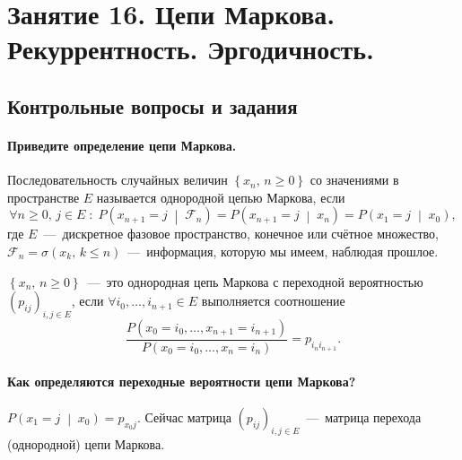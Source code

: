 \chapter*{Занятие 16. Цепи Маркова. Рекуррентность. Эргодичность.}

\section*{Контрольные вопросы и задания}

\subsubsection*{Приведите определение цепи Маркова.}

Последовательность случайных величин $ \left\{ x_n, \, n \geq 0 \right\} $
со значениями в пространстве $E$ называется однородной цепью Маркова, если
\begin{equation*}
  \forall n \geq 0, \,
  j \in E \; : \;
  P \left( x_{n + 1} = j \; \middle| \; \mathcal{F}_n \right) =
  P \left( x_{n + 1} = j \; \middle| \; x_n \right) =
  P \left( x_1 = j \; \middle| \; x_0 \right),
\end{equation*}
где $E$~---~дискретное фазовое пространство, конечное или счётное множество,
$ \mathcal{F}_n = \sigma \left( x_k, \, k \leq n \right) $~---~информация,
которую мы имеем, наблюдая прошлое.

$ \left\{ x_n, \, n \geq 0 \right\} $~---~это однородная цепь Маркова с
переходной вероятностью $ \left( p_{ij} \right)_{i, j \in E}$,
если $ \forall i_0, \dotsc, i_{n + 1} \in E$ выполняется соотношение
\begin{equation*}
  \frac{P \left( x_0 = i_0, \dotsc, x_{n + 1} = i_{n + 1} \right) }{P \left( x_0 = i_0, \dotsc, x_n = i_n \right) } =
  p_{i_n i_{n + 1}}.
\end{equation*}

\subsubsection*{Как определяются переходные вероятности цепи Маркова?}

$P \left( x_1 = j \; \middle| \; x_0 \right) = p_{x_0 j}$.
Сейчас матрица $ \left( p_{ij} \right)_{i, j \in E}$~---~матрица перехода
(однородной) цепи Маркова.

